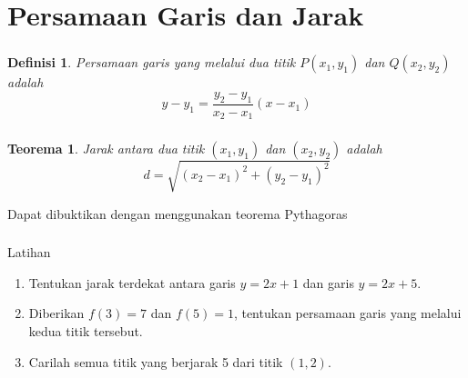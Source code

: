 \documentclass[aspectratio=169]{beamer}
\newtheorem{definisi}{Definisi}
\newtheorem{teorema}{Teorema}
\theoremstyle{definition}
\begin{document}
    \section{Persamaan Garis dan Jarak}
    \begin{frame}
        \frametitle{\insertsection}
        \begin{definisi}
            Persamaan garis yang melalui dua titik $P(x_1,y_1)$ dan $Q(x_2,y_2)$ adalah
            \[y-y_1=\frac{y_2-y_1}{x_2-x_1}(x-x_1)\]
        \end{definisi}
        \begin{center}
        \end{center}
    \end{frame}

    \begin{frame}
        \frametitle{\insertsection}
        \begin{teorema}
            Jarak antara dua titik $(x_1,y_1)$ dan $(x_2,y_2)$ adalah
            \[d=\sqrt{(x_2-x_1)^2+(y_2-y_1)^2}\] 
        \end{teorema}
        Dapat dibuktikan dengan menggunakan teorema Pythagoras
    \end{frame}

    \begin{frame}
        \frametitle{\insertsection}
        \begin{exampleblock}{Latihan}
            \begin{enumerate}[label=(\arabic*)]
                \item Tentukan jarak terdekat antara garis $y=2x+1$ dan garis $y=2x+5$.
                \item Diberikan $f(3)=7$ dan $f(5)=1$, tentukan persamaan garis yang melalui kedua titik tersebut.
                \item Carilah semua titik yang berjarak 5 dari titik $(1,2)$.
            \end{enumerate}
        \end{exampleblock}
    \end{frame}
\end{document}
